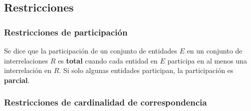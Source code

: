 \documentclass[a4paper, twoside]{article}
\begin{document}
\subsection{Restricciones}


\subsubsection{Restricciones de participación}

Se dice que la participación de un conjunto de entidades $E$ en un
conjunto de interrelaciones $R$ es \textbf{total} cuando cada entidad
en $E$ participa en al menos una interrelación en $R$. Si solo algunas
entidades participan, la participación es \textbf{parcial}.


\subsubsection{Restricciones de cardinalidad de correspondencia}
\end{document}
